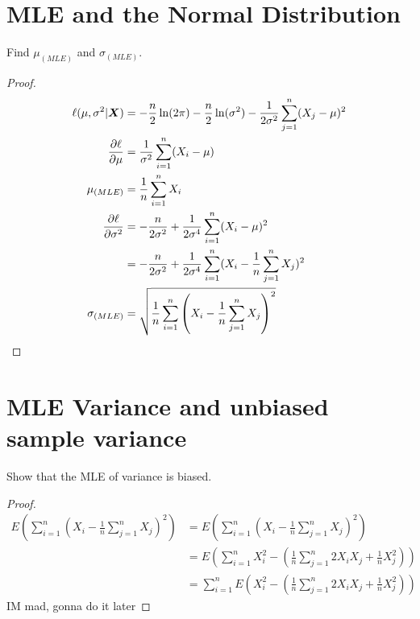 \documentclass{article}
\begin{document}
\maketitle 
\setlength{\parindent}{0pt}

\section{MLE and the Normal Distribution}
    
    Find $\mu_{(MLE)}$ and $\sigma_{(MLE)}$. 
    \begin{proof}
    \begin{align*}
        \ell(\mu, \sigma^2 | \boldsymbol{X}) &= -\frac{n}{2}\ln(2\pi) -
        \frac{n}{2}\ln(\sigma^2) - \frac{1}{2\sigma^2}\sum_{j=1}^n (X_j - \mu)^2
        \\
        \frac{\partial \ell}{\partial \mu} &= \frac{1}{\sigma^2}\sum_{i=1}^n (X_i-\mu)
        \\
        \mu_{(MLE)} &= \frac{1}{n}\sum_{i=1}^n X_i
        \\
        \frac{\partial \ell}{\partial \sigma^2} &= -\frac{n}{2\sigma^2} +
        \frac{1}{2\sigma^4}\sum_{i=1}^n (X_i - \mu)^2
        \\
        &= -\frac{n}{2\sigma^2} +
        \frac{1}{2\sigma^4}\sum_{i=1}^n (X_i - \frac{1}{n}\sum_{j=1}^n X_j)^2
        \\
        \sigma_{(MLE)} &= \sqrt{\frac{1}{n}\sum_{i=1}^n\left(X_i -
        \frac{1}{n}\sum_{j=1}^n X_j\right)^2}
    \end{align*}
    \end{proof}

\section{MLE Variance and unbiased sample variance}
    Show that the MLE of variance is biased. 
    \begin{proof}
        \begin{align*}
            E\left(\sum_{i=1}^n \left(X_i - \frac{1}{n}\sum_{j=1}^n
            X_j\right)^2\right) &= E\left(\sum_{i=1}^n \left(X_i -
            \frac{1}{n}\sum_{j=1}^n
            X_j\right)^2\right)
            \\
            &= E\left(\sum_{i=1}^{n} X_i^2 - \left(\frac{1}{n}\sum_{j=1}^n 2X_iX_j +
            \frac{1}{n}X_j^2\right)\right)
            \\
            &= \sum_{i=1}^n E\left(X_i^2 - \left(\frac{1}{n}\sum_{j=1}^n 2X_iX_j +
            \frac{1}{n}X_j^2\right)\right)
        \end{align*}
        IM mad, gonna do it later
    \end{proof}
\end{document}
